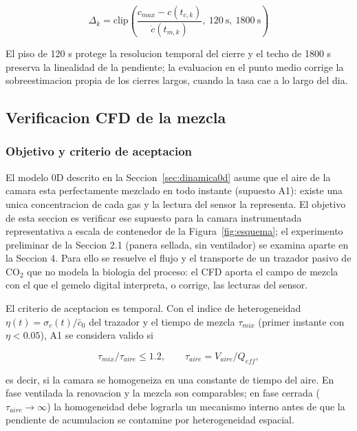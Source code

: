 \begin{equation}
  \Delta_k = \mathrm{clip}\left(
    \frac{c_{max} - c(t_{c,k})}{\dot{c}(t_{m,k})},\
    120\ \mathrm{s},\ 1800\ \mathrm{s} \right)
\end{equation}

El piso de 120 s protege la resolucion temporal del cierre y el techo de
1800 s preserva la linealidad de la pendiente; la evaluacion en el punto
medio corrige la sobreestimacion propia de los cierres largos, cuando la
tasa cae a lo largo del dia.



\subsection{Verificacion CFD de la mezcla}
\subsubsection{Objetivo y criterio de aceptacion}

El modelo 0D descrito en la Seccion~\ref{sec:dinamica0d} asume que el aire
de la camara esta perfectamente mezclado en todo instante (supuesto A1):
existe una unica concentracion de cada gas y la lectura del sensor la
representa. El objetivo de esta seccion es verificar ese supuesto para la
camara instrumentada representativa a escala de contenedor de la
Figura~\ref{fig:esquema}; el experimento preliminar de la
Seccion 2.1 (panera sellada, sin ventilador) se examina aparte
en la Seccion 4. Para ello se resuelve el flujo y el
transporte de un trazador pasivo de CO$_2$ que no modela la biologia del
proceso: el CFD aporta el campo de mezcla con el que el gemelo digital
interpreta, o corrige, las lecturas del sensor.

El criterio de aceptacion es temporal. Con el indice de heterogeneidad
$\eta(t) = \sigma_c(t)/\bar{c}_0$ del trazador y el tiempo de mezcla
$\tau_{mix}$ (primer instante con $\eta < 0.05$), A1 se considera valido si

\begin{equation}
  \tau_{mix}/\tau_{aire} \leq 1.2, \qquad
  \tau_{aire} = V_{aire}/Q_{eff},
\end{equation}

es decir, si la camara se homogeneiza en una constante de tiempo del aire.
En fase ventilada la renovacion y la mezcla son comparables; en fase
cerrada ($\tau_{aire} \rightarrow \infty$) la homogeneidad debe lograrla un
mecanismo interno antes de que la pendiente de acumulacion se contamine por
heterogeneidad espacial.

